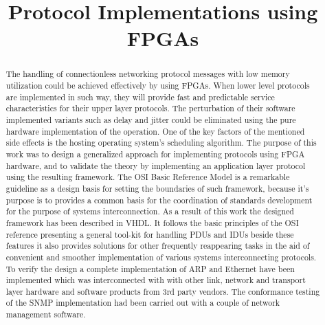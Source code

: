 \documentclass[conference]{IEEEtran}
\begin{document}
\title{Protocol Implementations using FPGAs}
\author{
}


\maketitle


\begin{abstract}
\boldmath
The handling of connectionless networking protocol messages with low memory utilization could be achieved effectively by using FPGAs. When lower level protocols are implemented in such way, they will provide fast and predictable service characteristics for their upper layer protocols. The perturbation of their software implemented variants such as delay and jitter could be eliminated using the pure hardware implementation of the operation. One of the key factors of the mentioned side effects is the hosting operating system’s scheduling algorithm.
The purpose of this work was to design a generalized approach for implementing protocols using FPGA hardware, and to validate the theory by implementing an application layer protocol using the resulting framework.
The OSI Basic Reference Model is a remarkable guideline as a design basis for setting the boundaries of such framework, because it’s purpose is to provides a common basis for the coordination of standards development for the purpose of systems interconnection.
As a result of this work the designed framework has been described in VHDL. It follows the basic principles of the OSI reference presenting a general tool-kit for handling  PDUs and IDUs beside these features it also provides solutions for other frequently reappearing tasks in the aid of convenient and smoother implementation of various systems interconnecting protocols.
To verify the design a complete implementation of ARP and Ethernet have been implemented which was interconnected with with other link, network and transport layer hardware and software products from 3rd party vendors. The conformance testing of the SNMP implementation had been carried out with a couple of network management software.
\end{abstract}
\end{document}
